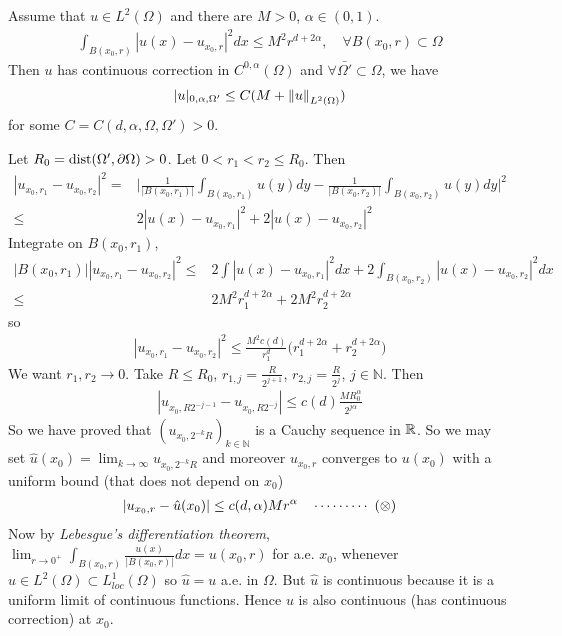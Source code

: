 \documentclass[12pt,a4paper]{article}
\newenvironment{proof}
{\begin{changemargin}{0.5cm}{0.5cm} 
	}%
	{\end{changemargin}
}
\newenvironment{p}
{\begin{proof} 
	}%
	{\end{proof}
}
\begin{document}
\thm Assume that $u\in L^2(\Omega)$ and there are $M>0$, $\alpha \in (0,1)$.
\begin{align*}
\int_{B(x_0, r)} |u (x) - u_{x_0, r}|^2 dx \leq M^2 r^{d+ 2\alpha}, \quad \forall B(x_0,r) \subset \Omega
\end{align*}
Then $u$ has continuous correction in $C^{0, \alpha}(\Omega)$ and $\forall \bar{\Omega'} \subset \Omega$, we have 
\begin{align*}
|u|_{0, \alpha, \Omega'} \leq C(M + \snorms{u}{L^2(\Omega)})
\end{align*}
for some $C= C(d, \alpha, \Omega, \Omega') >0$.
\begin{p}
\pf Let $R_0 = \text{dist}(\Omega', \partial \Omega) >0$. Let $0< r_1< r_2 \leq R_0$. Then
\begin{align*}
|u_{x_0, r_1} - u_{x_0, r_2}|^2 =& \Big| \frac{1}{|B(x_0, r_1)|} \int_{B(x_0, r_1)}u(y)dy - \frac{1}{|B(x_0, r_2)|} \int_{B(x_0, r_2)}u(y)dy  \Big|^2 \\
\leq& 2|u(x) - u_{x_0, r_1}|^2 + 2|u(x) - u_{x_0, r_2}|^2
\end{align*}
Integrate on $B(x_0, r_1)$,
\begin{align*}
|B(x_0, r_1)| |u_{x_0, r_1} - u_{x_0, r_2}|^2 \leq & 2 \int |u(x) - u_{x_0, r_1}|^2  dx + 2\int_{B(x_0, r_2)}|u(x) - u_{x_0, r_2}|^2 dx \\
\leq & 2M^2 r_1^{d + 2\alpha} + 2M^2 r_2^{d+ 2\alpha}
\end{align*}
so
\begin{align*}
|u_{x_0, r_1} - u_{x_0, r_2}|^2 \leq \frac{M^2 c(d)}{r_1^d} \big( r_1^{d+2\alpha} + r_2^{d+ 2\alpha} \big)
\end{align*}
We want $r_1, r_2\rightarrow 0$. Take $R\leq R_0$, $r_{1,j} = \frac{R}{2^{j+1}}$, $r_{2,j} = \frac{R}{2^{j}}$, $j\in \mathbb{N}$. Then
\begin{align*}
|u_{x_0, R2^{-j-1}} - u_{x_0, R2^{-j}}| \leq c(d) \frac{M R_0^{\alpha}}{2^{j\alpha}}
\end{align*}
So we have proved that $(u_{x_0, 2^{-k}R})_{k\in\mathbb{N}}$ is a Cauchy sequence in $\mathbb{R}$. So we may set $\hat{u}(x_0) = \lim_{k\rightarrow \infty} u_{x_0, 2^{-k}R}$ and moreover $u_{x_0, r}$ converges to $u(x_0)$ with a uniform bound (that does not depend on $x_0$)
\begin{align*}
|u_{x_0, r} - \hat{u}(x_0)| \leq c(d, \alpha) Mr^{\alpha} \quad \cdots\cdots\cdots\,\,(\otimes)
\end{align*}
Now by \emph{Lebesgue's differentiation theorem}, $\lim_{r\rightarrow 0^+} \int_{B(x_0, r)} \frac{u(x)}{|B(x_0, r)|} dx = u(x_0, r)$ for a.e. $x_0$, whenever $u\in L^2(\Omega) \subset L^1_{loc}(\Omega)$ so $\hat{u} = u$ a.e. in $\Omega$. But $\hat{u}$ is continuous because it is a uniform limit of continuous functions. Hence $u$ is also continuous (has continuous correction) at $x_0$.
\s


\end{p}
\end{document}
